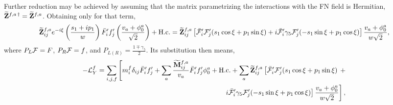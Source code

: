 \documentclass[aps,prd,groupaddress,floatfix,tighten,nofootinbib,showpacs,
amsfonts,superscriptaddress]{revtex4}
\begin{document}
Further reduction may be achieved by assuming that the matrix parametrizing 
the interactions with the FN field is Hermitian, $\widetilde{\bf Z}^{f,a\, \dagger} = \widetilde{\bf Z}^{f,a}$. Obtaining only for that term,
%
\begin{eqnarray} \nonumber
\widetilde{\bf Z}_{ij}^{f,a} e^{-i\xi } \left( \frac{s_1+i p_1}{w} \right) \bar{F}'_{i} f'_j \left( \frac{v_a + \phi^a_0}{\sqrt{2}} \right)+ {\textrm{H.c.}} 
	= \widetilde{\bf Z}_{ij}^{f,a} \left[ \bar{\cal F}'_{i} {\cal F}'_j (s_1 \cos \xi + p_1 \sin \xi )
+  {i} \bar{\cal F}'_{i} \gamma_5 {\cal F}'_j (- s_1 \sin \xi + p_1 \cos \xi ) \right] \frac{v_a + \phi^a_0}{w\sqrt{2}},	
\end{eqnarray}
%
where $P_{L} {\cal F} = F$, $P_R {\cal F} = f$, and $P_{L(R)} = \displaystyle{\frac{1\mp \gamma_5}{2}}$. Its substitution then means,
%
\begin{eqnarray} \nonumber
		-{\cal L}_Y^f = \sum_{i,j,f} \left[ m^f_i \delta_{ij}
		\bar{F}'_{i} f'_j  +  \sum_a\frac{\widetilde{\bf M}^{f,a}_{ij}}{v_a} \bar{F}'_{i} f'_j \phi_0^a + {\textrm{H.c.}}
		+ \sum_a \widetilde{\bf Z}_{ij}^{f,a} \left[ \bar{\cal F}'_{i} {\cal F}'_j (s_1 \cos \xi + p_1 \sin \xi ) \right. \right.
+ \\ \left. \left. {i} \bar{\cal F}'_{i} \gamma_5 {\cal F}'_j (- s_1 \sin \xi + p_1 \cos \xi ) \right] \frac{v_a + \phi^a_0}{w\sqrt{2}} \right],
\end{eqnarray}
%
	
\end{document}

